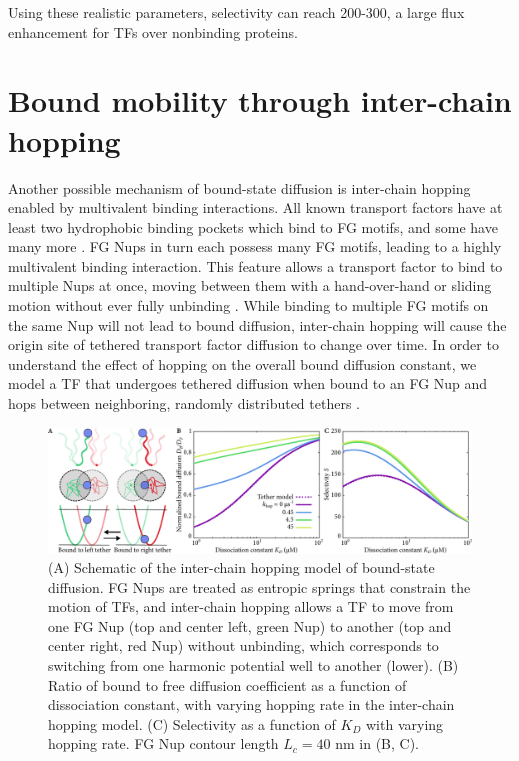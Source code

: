  Using these realistic parameters, selectivity can reach 200-300, a large flux enhancement for TFs over nonbinding proteins.

\section{Bound mobility through inter-chain hopping}

Another possible mechanism of bound-state diffusion is inter-chain hopping enabled by multivalent binding interactions.  All known transport factors have at least two hydrophobic binding pockets which bind to FG motifs, and some have many more \cite{something?}.  FG Nups in turn each possess many FG motifs, leading to a highly multivalent binding interaction.  This feature allows a transport factor to bind to multiple Nups at once, moving between them with a hand-over-hand or sliding motion without ever fully unbinding \cite{raveh16, tetenbaum-novatt12}.  While binding to multiple FG motifs on the same Nup will not lead to bound diffusion, inter-chain hopping will cause the origin site of tethered transport factor diffusion to change over time.  In order to understand the effect of hopping on the overall bound diffusion constant, we model a TF that undergoes tethered diffusion when bound to an FG Nup and hops between neighboring, randomly distributed tethers .

\begin{figure}
\centering
\includegraphics[width = \textwidth]{figs/ch02/fig4.pdf}
\caption{(A) Schematic of the inter-chain hopping model of bound-state diffusion. FG Nups are treated as entropic springs that constrain the motion of TFs, and inter-chain hopping allows a TF to move from one FG Nup (top and center left, green Nup) to another (top and center right, red Nup) without unbinding, which corresponds to switching from one harmonic potential well to another (lower). (B) Ratio of bound to free diffusion coefficient as a function of dissociation constant, with varying hopping rate in the inter-chain hopping model.  (C) Selectivity as a function of $K_D$ with varying hopping rate. FG Nup contour length $L_c = 40$ nm in (B, C). }
\label{fig:hopping}
\end{figure}

